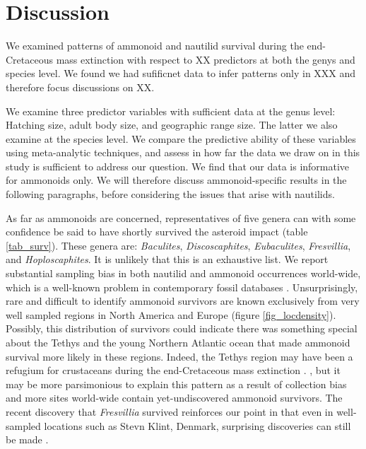 \documentclass[a4paper]{article}
\begin{document}
\section*{Discussion}

We examined patterns of ammonoid and nautilid survival during the end-Cretaceous mass extinction with respect to XX predictors at both the genys and species level. We found we had sufificnet data to infer patterns only in XXX and therefore focus discussions on XX. 

We examine three predictor variables with sufficient data at the genus level: Hatching size, adult body size, and geographic range size. The latter we also examine at the species level. We compare the predictive ability of these variables using meta-analytic techniques, and assess in how far the data we draw on in this study is sufficient to address our question.
We find that our data is informative for ammonoids only. We will therefore discuss ammonoid-specific results in the following paragraphs, before considering the issues that arise with nautilids. 

As far as ammonoids are concerned, representatives of five genera can with some confidence be said to have shortly survived the asteroid impact (table \ref{tab_surv}). These genera are: \textit{Baculites}, \textit{Discoscaphites}, \textit{Eubaculites}, \textit{Fresvillia}, and \textit{Hoploscaphites}. It is unlikely that this is an exhaustive list.
We report substantial sampling bias in both nautilid and ammonoid occurrences world-wide, which is a well-known problem in contemporary fossil databases \parencite{rajaColonialHistoryGlobal2022}.
Unsurprisingly, rare and difficult to identify ammonoid survivors are known exclusively from very well sampled regions in North America and Europe (figure \ref{fig_locdensity}). 
Possibly, this distribution of survivors could indicate there was something special about the Tethys and the young Northern Atlantic ocean that made ammonoid survival more likely in these regions. 
Indeed, the Tethys region may have been a refugium for crustaceans during the end-Cretaceous mass extinction \parencite{schweitzerSelectiveExtinctionEndCretaceous2023}.
, but it may be more parsimonious to explain this pattern as a result of collection bias and more sites world-wide contain yet-undiscovered ammonoid survivors.
The recent discovery that \textit{Fresvillia} survived reinforces our point in that even in well-sampled locations such as Stevn Klint, Denmark, surprising discoveries can still be made \parencite{machalskiAmmoniteSurvivalCretaceous2025}. 
\end{document}
